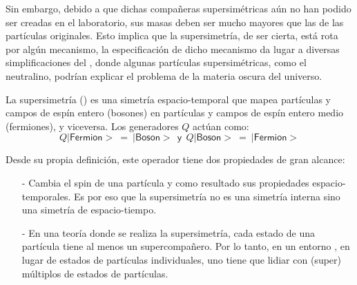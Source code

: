 Sin embargo, debido a que dichas compañeras supersimétricas aún no han podido ser creadas en el laboratorio, sus masas deben ser mucho mayores que las de las partículas originales. Esto implica que la supersimetría, de ser cierta, está rota por algún mecanismo, la especificación de dicho mecanismo da lugar a diversas simplificaciones del \MSSM, donde algunas partículas supersimétricas, como el neutralino, podrían explicar el problema de la materia oscura del universo.

La supersimetría (\SUSY) es una simetría espacio-temporal que mapea partículas y campos de espín entero (bosones) en partículas y campos de espín entero medio (fermiones), y viceversa. Los generadores $Q$ actúan como:
\begin{equation}
Q|\textsf{Fermion}> ~ = ~ |\textsf{Boson}> ~~ \textsf{y} ~~ Q|\textsf{Boson}> ~ = ~ |\textsf{Fermion}>
\end{equation}

Desde su propia definición, este operador tiene dos propiedades de gran alcance:
\begin{itemize}
\item[-] Cambia el spin de una partícula y como resultado sus propiedades espacio-temporales. Es por eso que la supersimetría no es una simetría interna sino una simetría de espacio-tiempo.
\item[-] En una teoría donde se realiza la supersimetría, cada estado de una partícula tiene al menos un supercompañero. Por lo tanto, en un entorno \SUSY, en lugar de estados de partículas individuales, uno tiene que lidiar con (super) múltiplos de estados de partículas.
\end{itemize}


